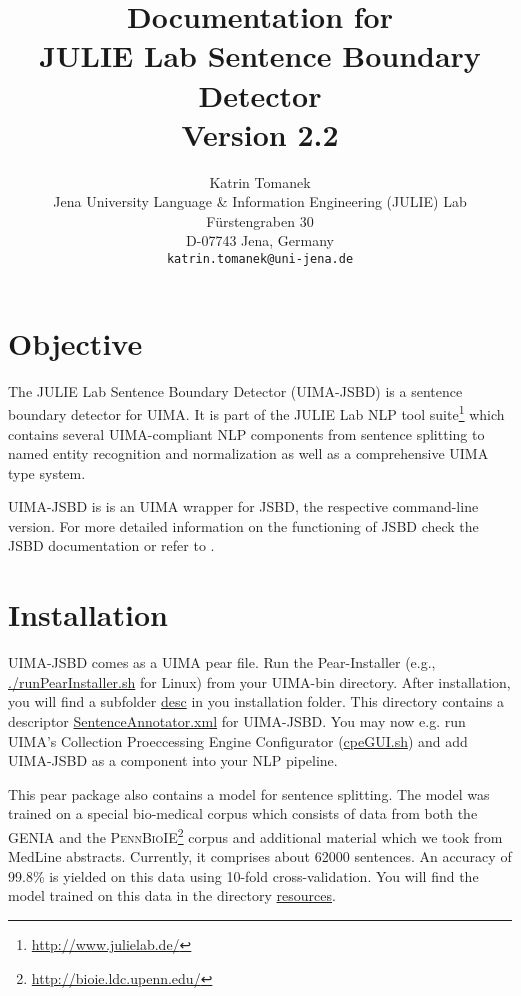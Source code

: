 \documentclass[11pt,a4paper,halfparskip]{scrartcl}
\title{\small{Documentation for}\\\huge JULIE Lab Sentence Boundary Detector\\\vspace{3mm}\small{Version 2.2}}
\author{\normalsize Katrin Tomanek\\
  \normalsize  Jena University Language \& Information Engineering (JULIE) Lab\\
  \normalsize F\"urstengraben 30 \\
  \normalsize D-07743 Jena, Germany\\
  {\normalsize \tt katrin.tomanek@uni-jena.de} }
\date{}
\begin{document}
\maketitle

\section{Objective}

The JULIE Lab Sentence Boundary Detector (UIMA-JSBD) is a sentence
boundary detector for UIMA.  It is part of the JULIE Lab NLP tool
suite\footnote{\url{http://www.julielab.de/}} which contains several
UIMA-compliant NLP components from sentence splitting to named entity
recognition and normalization as well as a comprehensive UIMA type
system.

UIMA-JSBD is is an UIMA wrapper for JSBD, the respective command-line
version. For more detailed information on the functioning of JSBD
check the JSBD documentation or refer to \cite{Tomanek2007a}.

\section{Installation}

UIMA-JSBD comes as a UIMA pear file. Run the Pear-Installer (e.g.,
\url{./runPearInstaller.sh} for Linux) from your UIMA-bin directory.
After installation, you will find a subfolder \url{desc} in you
installation folder. This directory contains a descriptor
\url{SentenceAnnotator.xml} for UIMA-JSBD. You may now e.g. run UIMA's
Collection Proeccessing Engine Configurator (\url{cpeGUI.sh}) and add
UIMA-JSBD as a component into your NLP pipeline.

This pear package also contains a model for sentence splitting. The
model was trained on a special bio-medical corpus which consists of
data from both the GENIA \cite{Ohta2002} and the
\textsc{PennBioIE}\footnote{\url{http://bioie.ldc.upenn.edu/}} corpus
and additional material which we took from MedLine abstracts.
Currently, it comprises about 62000 sentences. An accuracy of 99.8\%
is yielded on this data using 10-fold cross-validation.  You will find
the model trained on this data in the directory \url{resources}.



\end{document}
